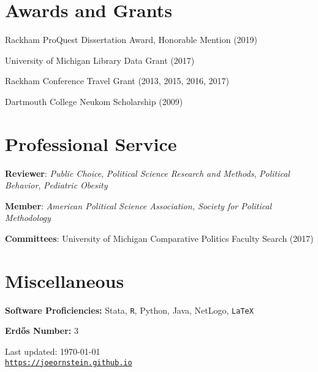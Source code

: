 \documentclass[letterpaper]{article}
\def\footerlink{https://joeornstein.github.io}
\renewenvironment{itemize}{
  \begin{list}{}{
    \setlength{\leftmargin}{1.5em}
  }
}{
  \end{list}
}
\begin{document}
\section*{Awards and Grants}
\begin{itemize}
\item Rackham ProQuest Dissertation Award, Honorable Mention (2019)
\item University of Michigan Library Data Grant (2017)
\item Rackham Conference Travel Grant (2013, 2015, 2016, 2017)
\item Dartmouth College Neukom Scholarship (2009)
\end{itemize}

\hrulefill

\section*{Professional Service}

\begin{itemize}
\item \textbf{Reviewer}: \textit{Public Choice}, \textit{Political Science Research and Methods}, \textit{Political Behavior}, \textit{Pediatric Obesity}
\item \textbf{Member}: \textit{American Political Science Association, Society for Political Methodology}
\item \textbf{Committees}: University of Michigan Comparative Politics Faculty Search (2017)
\end{itemize}

\hrulefill

\section*{Miscellaneous}
\begin{itemize}
\item \textbf{Software Proficiencies:} Stata, {\tt R}, Python, Java, NetLogo, {\tt LaTeX}
\item \textbf{Erd\H{o}s Number:} 3
\end{itemize}

\bigskip

\begin{center}
  \begin{footnotesize}
    Last updated: \today \\
    \href{\footerlink}{\texttt{\footerlink}}
  \end{footnotesize}
\end{center}
\end{document}
